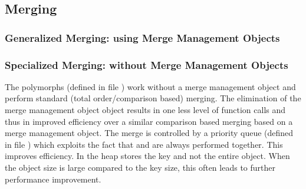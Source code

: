 
\subsection{Merging}

\tobeextended


%

\subsubsection{Generalized Merging: using Merge Management Objects}

\tobeextended


\subsubsection{Specialized Merging: without Merge Management Objects}

\tobeextended

The  polymorphs (defined in file
) work without a merge
management object and perform standard (total
order/comparison based) merging. The elimination of the
merge management object object results in one less level of
function calls and thus in improved efficiency over a
similar comparison based merging based on a merge management
object. The merge is controlled by a priority queue (defined
in file ) which exploits the
fact that  and  are always
performed together. This improves efficiency. In
  the heap stores the
key and not the entire object. When the object size is large
compared to the key size, this often leads to further
performance improvement.

